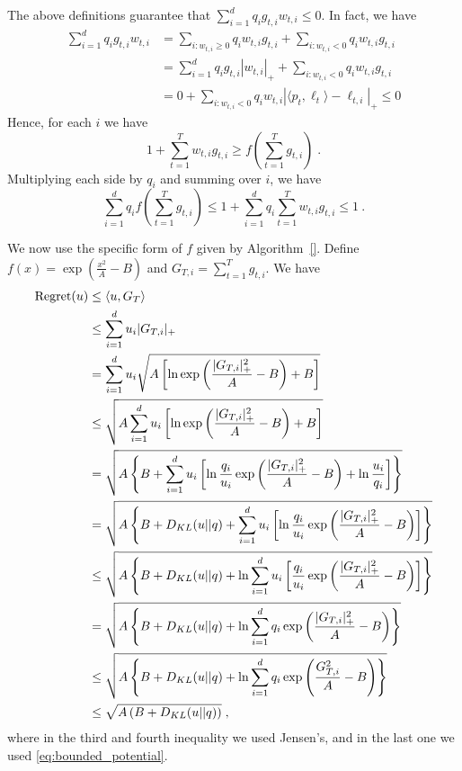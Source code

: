 The above definitions guarantee that $\sum_{i=1}^d q_i g_{t,i} w_{t,i} \le 0$. In fact, we have
\begin{align*}
\sum_{i=1}^d q_i g_{t,i} w_{t,i}
& = \sum_{i:w_{t,i}\ge 0} q_i w_{t,i} g_{t,i} + \sum_{i:w_{t,i} < 0} q_i w_{t,i} g_{t,i} \\
& = \sum_{i=1}^d q_i g_{t,i} |w_{t,i}|_+ + \sum_{i:w_{t,i} < 0} q_i w_{t,i} g_{t,i} \\
& = 0 + \sum_{i:w_{t,i} < 0} q_i w_{t,i} |\langle p_t, \ell_t\rangle - \ell_{t,i}|_+ \le 0
\end{align*}
Hence, for each $i$ we have
\[
1 + \sum_{t=1}^T w_{t,i} g_{t,i} \ge f \left( \sum_{t=1}^T g_{t,i} \right) \; .
\]
Multiplying each side by $q_i$ and summing over $i$, we have
\begin{equation}
\label{eq:bounded_potential}
\sum_{i=1}^d q_i f\left(\sum_{t=1}^T g_{t,i} \right) \le 1 + \sum_{i=1}^d q_i \sum_{t=1}^T w_{t,i} g_{t,i} \le 1~.
\end{equation}

We now use the specific form of $f$ given by Algorithm~\ref{}.
Define $f(x)= \exp(\frac{x^2}{A} - B)$ and $G_{T,i}=\sum_{t=1}^T g_{t,i}$.
We have
\begin{align*}
\operatorname{Regret}(u) & \le \langle u, G_T \rangle \\
& \le \sum_{i=1}^d u_i |G_{T,i}|_+ \\
& = \sum_{i=1}^d u_i \sqrt{A \left[\ln \exp\left(\frac{|G_{T,i}|_+^2}{A} - B\right)+B \right]} \\
& \le \sqrt{A \sum_{i=1}^d u_i \left[\ln \exp\left(\frac{|G_{T,i}|_+^2}{A} - B\right)+B \right]} \\
& = \sqrt{A \left\{B + \sum_{i=1}^d u_i \left[\ln \frac{q_i}{u_i}\exp\left(\frac{|G_{T,i}|_+^2}{A} - B \right) + \ln \frac{u_i}{q_i}\right]\right\}} \\
& = \sqrt{A \left\{B + D_{KL}(u||q) + \sum_{i=1}^d u_i \left[\ln \frac{q_i}{u_i}\exp\left(\frac{|G_{T,i}|_+^2}{A} - B\right)\right]\right\}} \\
& \le \sqrt{A \left\{B + D_{KL}(u||q) + \ln \sum_{i=1}^d u_i \left[ \frac{q_i}{u_i}\exp\left(\frac{|G_{T,i}|_+^2}{A} - B\right)\right]\right\}} \\
& = \sqrt{A \left\{B + D_{KL}(u||q) + \ln \sum_{i=1}^d q_i\exp\left(\frac{|G_{T,i}|_+^2}{A}-B\right)\right\}} \\
& \le \sqrt{A \left\{B + D_{KL}(u||q) + \ln \sum_{i=1}^d q_i\exp\left(\frac{G_{T,i}^2}{A}-B\right)\right\}} \\
& \le \sqrt{A \left(B + D_{KL}(u||q)\right)} \; ,
\end{align*}
where in the third and fourth inequality we used Jensen's, and in the last one
we used \eqref{eq:bounded_potential}.
